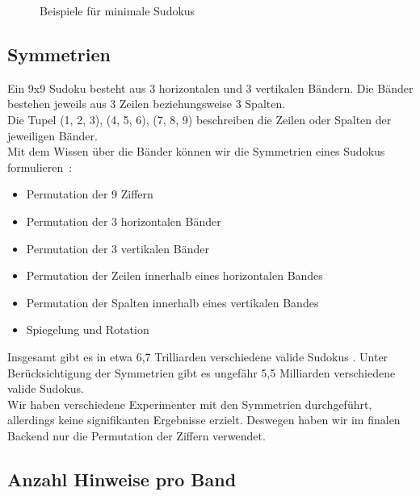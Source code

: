 \begin{figure}[H]
\begin{minipage}{0.48\textwidth}
    \end{minipage}
    \caption{Beispiele für minimale Sudokus}
    \label{fig:minimal_hinweise}
\end{figure}





\subsection{Symmetrien}
Ein 9x9 Sudoku besteht aus 3 horizontalen und 3 vertikalen Bändern.
Die Bänder bestehen jeweils aus 3 Zeilen beziehungsweise 3 Spalten. \\
Die Tupel (1, 2, 3), (4, 5, 6), (7, 8, 9) beschreiben die Zeilen oder Spalten der jeweiligen Bänder. \\
Mit dem Wissen über die Bänder können wir die Symmetrien eines Sudokus formulieren~\cite{russell2006mathematics}: \\
\begin{itemize}
    \item Permutation der 9 Ziffern
    \item Permutation der 3 horizontalen Bänder
    \item Permutation der 3 vertikalen Bänder
    \item Permutation der Zeilen innerhalb eines horizontalen Bandes
    \item Permutation der Spalten innerhalb eines vertikalen Bandes
    \item Spiegelung und Rotation
\end{itemize}
Insgesamt gibt es in etwa 6,7 Trilliarden verschiedene valide Sudokus \cite{felgenhauer2006mathematics}.
Unter Berücksichtigung der Symmetrien gibt es ungefähr 5,5 Milliarden verschiedene valide Sudokus\cite{russell2006mathematics}. \\
Wir haben verschiedene Experimenter mit den Symmetrien durchgeführt, allerdings keine signifikanten Ergebnisse erzielt.
Deswegen haben wir im finalen Backend nur die Permutation der Ziffern verwendet.

\subsection{Anzahl Hinweise pro Band}

